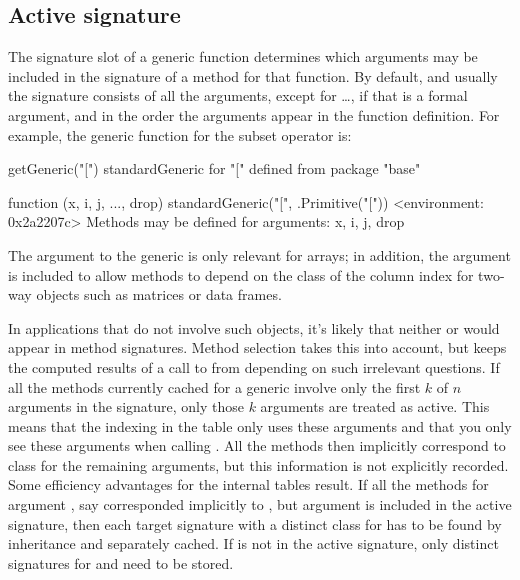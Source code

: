 \documentclass[11pt]{article}
\begin{document}
\subsection*{Active signature}
\label{sec:active-signature}

The signature slot of a generic function determines which arguments may be included in the signature of a method for that function.
By default, and usually the signature consists of all the arguments, except for \dots{}, if that is a formal argument, and in the order the arguments appear in the function definition.
For example, the generic function for the subset operator is:
\begin{Example}
\SPrompt{}getGeneric("[")
standardGeneric for "[" defined from package "base"

function (x, i, j, ..., drop)
standardGeneric("[", .Primitive("["))
<environment: 0x2a2207c>
Methods may be defined for arguments: x, i, j, drop
\end{Example}
The argument  to the generic is only relevant for arrays; in addition, the argument  is included to allow methods to depend on the class of the column index for two-way objects such as matrices or data frames.

In applications that do not involve such objects, it's likely that neither  or  would appear in method signatures.
Method selection takes this into account, but keeps the computed results of a call to \SOperator{[} from depending on such irrelevant questions.
If all the methods currently cached for a generic involve only the first $k$ of $n$ arguments in the signature, only those $k$ arguments are treated as active.
This means that the indexing in the table only uses these arguments and that you only see these arguments when calling .
All the methods then implicitly correspond to class  for the remaining arguments, but this information is not explicitly recorded.
Some efficiency advantages for the internal tables result.
If all the methods for argument , say corresponded implicitly to , but argument  is included in the active signature, then each target signature with a distinct class for  has to be found by inheritance and separately cached.
If  is not in the active signature, only distinct signatures for  and  need to be stored.
\end{document}
